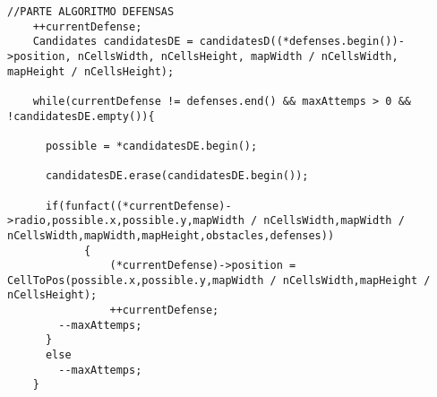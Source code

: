 \begin{lstlisting}
//PARTE ALGORITMO DEFENSAS
    ++currentDefense;
    Candidates candidatesDE = candidatesD((*defenses.begin())->position, nCellsWidth, nCellsHeight, mapWidth / nCellsWidth, mapHeight / nCellsHeight);

    while(currentDefense != defenses.end() && maxAttemps > 0 && !candidatesDE.empty()){

      possible = *candidatesDE.begin();

      candidatesDE.erase(candidatesDE.begin());

      if(funfact((*currentDefense)->radio,possible.x,possible.y,mapWidth / nCellsWidth,mapWidth / nCellsWidth,mapWidth,mapHeight,obstacles,defenses))
			{
				(*currentDefense)->position = CellToPos(possible.x,possible.y,mapWidth / nCellsWidth,mapHeight / nCellsHeight);
				++currentDefense;
        --maxAttemps;
      }
      else
        --maxAttemps;
    }

\end{lstlisting}
